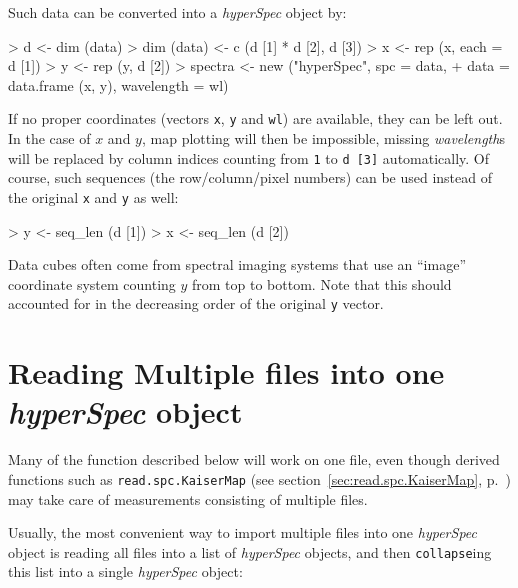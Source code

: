 \documentclass[english, a4paper, 10pt, headings=small, DIV11]{scrartcl}
\renewenvironment{Schunk}{\vspace{0pt}\begin{small}}{\end{small}\vspace{0pt}}
\newcommand{\Rcode}[2][]{\texorpdfstring{\nohyphens{#1\texttt{#2}}}{#2}}
\newcommand{\Rfunction}[2][]{\texorpdfstring{\nohyphens{#1\texttt{#2}}}{#2}}
\newcommand{\Rfunarg}[1]{\texorpdfstring{\nohyphens{\textit{#1}}}{#1}}
\newcommand{\Rclass}[1]{\texorpdfstring{\nohyphens{\textit{#1}}}{#1}}
\newcommand{\chy}{\Rclass{hyperSpec}\xspace}
\begin{document}
Such data can be converted into a \chy object by:
\begin{Schunk}
\begin{Sinput}
> d <- dim (data)
> dim (data) <- c (d [1] * d [2], d [3])
> x <- rep (x, each = d [1])
> y <- rep (y, d [2])
> spectra <- new ("hyperSpec", spc = data,
+    data = data.frame (x, y), wavelength = wl)
\end{Sinput}
\end{Schunk}

If no proper coordinates (vectors \Rcode{x}, \Rcode{y} and \Rcode{wl}) are available, they can be left
out. In the case of $x$ and $y$, map plotting will then be impossible, missing \Rfunarg{wavelength}s
will be replaced by column indices counting from \Rcode{1} to \Rcode{d [3]} automatically. Of course,
such sequences (the row/column/pixel numbers) can be used instead of the original \Rcode{x} and
\Rcode{y} as well:
\begin{Schunk}
\begin{Sinput}
> y <- seq_len (d [1])
> x <- seq_len (d [2])
\end{Sinput}
\end{Schunk}

Data cubes often come from spectral imaging systems that use an ``image'' coordinate system counting
$y$ from top to bottom. Note that this should accounted for in the decreasing order of the original
\Rcode{y} vector.


\section{Reading Multiple files into one \chy object}
\label{sec:read-mult-files}

Many of the function described below will work on one file, even though derived functions such as
\Rfunction{read.spc.KaiserMap} (see section~\ref{sec:read.spc.KaiserMap},
p.~\pageref{sec:read.spc.KaiserMap}) may take care of measurements consisting of multiple files.

Usually, the most convenient way to import multiple files into one \chy object is reading all files into a list of \chy objects, and then \Rfunction{collapse}ing this list into a single \chy object:
\end{document}
